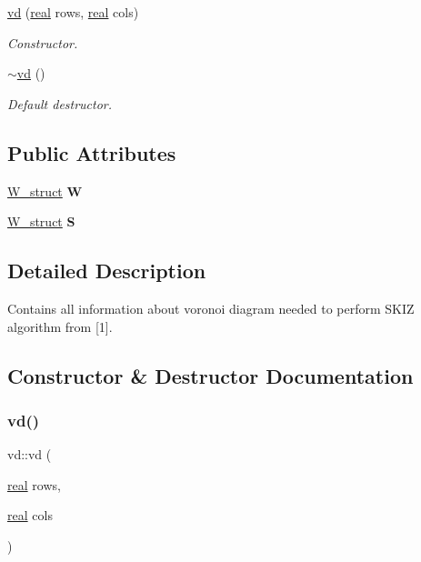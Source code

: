 \begin{DoxyCompactItemize}
\mbox{\hyperlink{classvd_a765c16ee377a2a0f9651d555edd3a158}{vd}} (\mbox{\hyperlink{typedefs_8h_a58a0c7cf2501f4492da833421be92547}{real}} rows, \mbox{\hyperlink{typedefs_8h_a58a0c7cf2501f4492da833421be92547}{real}} cols)
\begin{DoxyCompactList}\small\item\em Constructor. \end{DoxyCompactList}\item 
\mbox{\label{classvd_a331bc7a75e3f5ea3b750d1d22a9df287}} 
\mbox{\hyperlink{classvd_a331bc7a75e3f5ea3b750d1d22a9df287}{$\sim$vd}} ()
\begin{DoxyCompactList}\small\item\em Default destructor. \end{DoxyCompactList}\end{DoxyCompactItemize}
\subsection*{Public Attributes}
\begin{DoxyCompactItemize}
\item 
\mbox{\label{classvd_ab23d33e6c11c46ad3302a874a4726542}} 
\mbox{\hyperlink{structW__struct}{W\+\_\+struct}} {\bfseries W}
\item 
\mbox{\label{classvd_a960c80ec5b52938f999f528a5e3cccf1}} 
\mbox{\hyperlink{structW__struct}{W\+\_\+struct}} {\bfseries S}
\end{DoxyCompactItemize}


\subsection{Detailed Description}
Contains all information about voronoi diagram needed to perform S\+K\+IZ algorithm from \mbox{[}1\mbox{]}. 

\subsection{Constructor \& Destructor Documentation}
\mbox{\label{classvd_a765c16ee377a2a0f9651d555edd3a158}} 
\subsubsection{\texorpdfstring{vd()}{vd()}}
{\footnotesize\ttfamily vd\+::vd (\begin{DoxyParamCaption}\item[{\mbox{\hyperlink{typedefs_8h_a58a0c7cf2501f4492da833421be92547}{real}}}]{rows,  }\item[{\mbox{\hyperlink{typedefs_8h_a58a0c7cf2501f4492da833421be92547}{real}}}]{cols }\end{DoxyParamCaption})}



